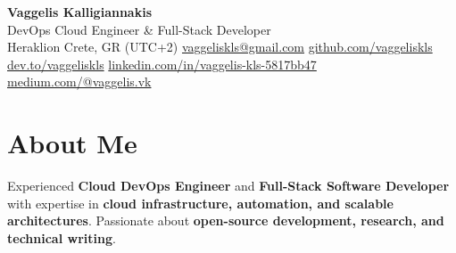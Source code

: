 \documentclass[a4paper,10pt]{article}
\begin{document}
\pagestyle{empty}

\begin{center}
    {\huge \textbf{Vaggelis Kalligiannakis} } \\
    \vspace{7pt}
    {\large DevOps Cloud Engineer \& Full-Stack Developer} \\
    \vspace{7pt}
     Heraklion Crete, GR (UTC+2) \quad
     \href{mailto:vaggeliskls@gmail.com}{vaggeliskls@gmail.com} \quad
     \href{https://github.com/vaggeliskls}{github.com/vaggeliskls} \quad
     \href{https://dev.to/vaggeliskls}{dev.to/vaggeliskls} \quad
     \href{https://www.linkedin.com/in/vaggelis-kls-5817bb47/}{linkedin.com/in/vaggelis-kls-5817bb47} \quad
     \href{https://medium.com/@vaggelis.vk}{medium.com/@vaggelis.vk}
\end{center}

\vspace{4pt}

\section*{ About Me}
Experienced \textbf{Cloud DevOps Engineer} and \textbf{Full-Stack Software Developer} with expertise in \textbf{cloud infrastructure, automation, and scalable architectures}.  
Passionate about \textbf{open-source development, research, and technical writing}.

\vspace{2pt}

\end{document}
